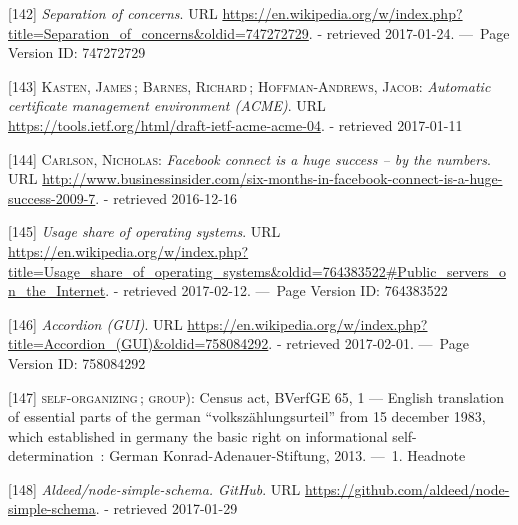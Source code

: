 \documentclass[12pt,english,a4paper,titlepage,cleardoublepage=empty,dottedtoc]{report}
\begin{document}
\hypertarget{ref-web_2016_wikipedia_separation-of-concerns}{}
{[}142{]} \emph{Separation of concerns}. URL
\url{https://en.wikipedia.org/w/index.php?title=Separation_of_concerns\&oldid=747272729}.
- retrieved 2017-01-24. ---~Page Version ID: 747272729

\hypertarget{ref-web_spec_acme}{}
{[}143{]} \textsc{Kasten, James}\,; \textsc{Barnes, Richard}\,;
\textsc{Hoffman-Andrews, Jacob}: \emph{Automatic certificate management
environment (ACME)}. URL
\url{https://tools.ietf.org/html/draft-ietf-acme-acme-04}. - retrieved
2017-01-11

\hypertarget{ref-web_2009-success-of-facebook-connect}{}
{[}144{]} \textsc{Carlson, Nicholas}: \emph{Facebook connect is a huge
success -- by the numbers}. URL
\url{http://www.businessinsider.com/six-months-in-facebook-connect-is-a-huge-success-2009-7}.
- retrieved 2016-12-16

\hypertarget{ref-web_2017_wikipedia_os-market-share}{}
{[}145{]} \emph{Usage share of operating systems}. URL
\url{https://en.wikipedia.org/w/index.php?title=Usage_share_of_operating_systems\&oldid=764383522\#Public_servers_on_the_Internet}.
- retrieved 2017-02-12. ---~Page Version ID: 764383522

\hypertarget{ref-web_2016_wikipedia_accordion-gui}{}
{[}146{]} \emph{Accordion (GUI)}. URL
\url{https://en.wikipedia.org/w/index.php?title=Accordion_(GUI)\&oldid=758084292}.
- retrieved 2017-02-01. ---~Page Version ID: 758084292

\hypertarget{ref-court-decision_1983_census-act-germany}{}
{[}147{]} \textsc{self-organizing}\,; \textsc{group)}: Census act,
BVerfGE 65, 1 --- English translation of essential parts of the german
``volkszählungsurteil'' from 15 december 1983, which established in
germany the basic right on informational self-determination~: German
Konrad-Adenauer-Stiftung, 2013. ---~1. Headnote

\hypertarget{ref-web_2017_repo_node-simple-schema}{}
{[}148{]} \emph{Aldeed/node-simple-schema. GitHub}. URL
\url{https://github.com/aldeed/node-simple-schema}. - retrieved
2017-01-29
\end{document}
